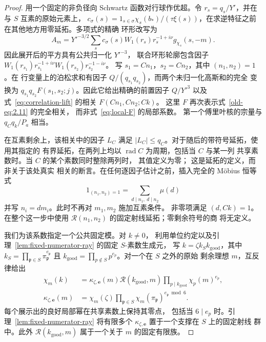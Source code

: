 \documentclass[11pt,a4paper]{article}
\numberwithin{equation}{section}
\numberwithin{figure}{section}
\theoremstyle{definition}
\theoremstyle{remark}
\begin{document}
\begin{proof}
用一个固定的非负径向 Schwartz 函数对行球作优超。令
$r_s=q_s/Y'$，并在与 $S$ 互素的原始元素上，
$c_\sigma(s)=1_{s\in\sigma}\chi_s(b_*)/(\tau\xi(s))$，在求逆特征之前
在其他地方用零延拓。多项式的精确
环形改写为
\[
 A_m=Y'^{-3/2}\sum_s c_\sigma(s)W_1(r_s)r_s^{-1+i\nu}
                          g_{\chi_s}(s,-m).
\]
因此展开后的平方具有公共归一化 $Y'^{-3}$，
联合环形轮廓包含因子
$W_1(r_{s_1})r_{s_1}^{-1+i\nu}W_1(r_{s_2})r_{s_2}^{-1-i\nu}$。
写 $s_1=Cn_1$，$s_2=Cn_2$，其中 $(n_1,n_2)=1$。在
行变量上的泊松求和有因子 $Q/(q_{s_1}q_{s_2})$，而两个未归一化高斯和的完全
变换为
$q_{s_1}q_{s_2}F(s_1,s_2;j)$。因此它给出精确的前置因子
$Q/Y'^3$ 以及式~\eqref{eq:correlation-lift} 的相关
$F(Cn_1,Cn_2;Ck)$。
这里 $F$ 再次表示式~\eqref{old-eq:2.11} 的完全相关，
而非式~\eqref{eq:local-F} 的局部系数。
第一个傅里叶核的宗量与 $q_Cq_k/P_a$ 相当。

在互素剩余上，该相关中的因子 $L_C$ 满足
$|L_C|\le q_C$。对于随后的带符号延拓，使用其指定的
有界延拓，在两列上均以 $\operatorname{rad}C$ 为周期，包括当 $C$ 与某一列
共享素数时。当 $C$ 的某个素数同时整除两列时，
其值定义为零；
这是延拓的定义，而非关于该处真实
相关的断言。在任何逐因子估计之前，插入完全的
M\"obius 恒等式
\[
 1_{(n_1,n_2)=1}=\sum_{d\mid n_1,\ d\mid n_2}\mu(d)
\]
并写 $n_i=dm_i$。此时不再对 $m_1,m_2$ 施加互素条件。
非零项满足 $(d,Ck)=1$。在整个这一步中使用
$\mathcal R(n_1,n_2)$ 的固定射线延拓；零剩余符号的商
将无定义。

我们为该系数指定一个公共固定模。对 $k\ne0$，
利用单位约定以及引理~\ref{lem:fixed-numerator-ray} 的固定 $S$-素数生成元，
写 $k=\zeta k_Sk_{\mathrm{good}}$，其中
$k_S=\prod_{\mathfrak p\in S}\pi_{\mathfrak p}^{e_{\mathfrak p}}$
且 $k_{\mathrm{good}}=\prod_{p\notin S}p^{e_p}$。对一个在 $S$ 之外的原始
剩余理想 $m$，互反律给出
\[
 \begin{split}
 \chi_m(k)&=\kappa_{\zeta,\boldsymbol e}(m)
       \mathcal R(k_{\mathrm{good}},m)
       \prod_{p\mid k_{\mathrm{good}}}\chi_p(m)^{e_p},\\
 \kappa_{\zeta,\boldsymbol e}(m)
       &=\chi_m(\zeta)\prod_{\mathfrak p\in S}
             \chi_m(\pi_{\mathfrak p})^{e_{\mathfrak p}\bmod6}.
 \end{split}
\]
每个展示出的良好局部幂在共享素数上保持其零点，
包括当 $6\mid e_p$ 时。引理~\ref{lem:fixed-numerator-ray}
将有限多个 $\kappa_{\zeta,\boldsymbol e}$ 置于一个支撑在 $S$ 上的固定射线
群中。此外 $\mathcal R(k_{\mathrm{good}},m)$
属于一个关于 $m$ 的固定有限族。


\end{proof}
\end{document}
